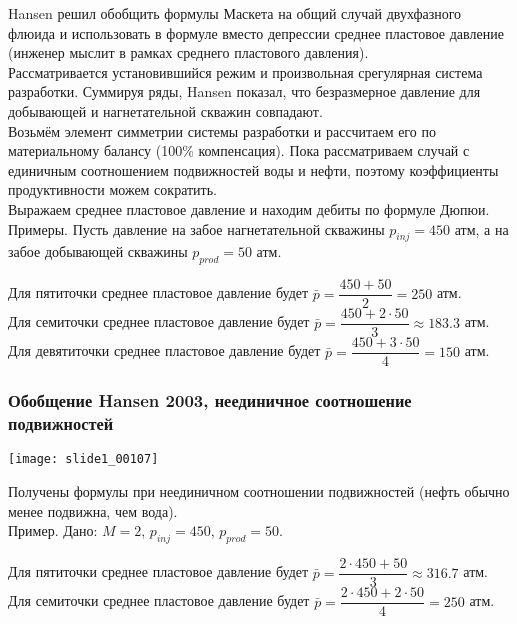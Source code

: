 \documentclass[main.tex]{subfiles}
\begin{document}
Hansen решил обобщить формулы Маскета на общий случай двухфазного флюида и использовать в формуле вместо депрессии среднее пластовое давление (инженер мыслит в рамках среднего пластового давления).\\

Рассматривается установившийся режим и произвольная срегулярная система разработки. Суммируя ряды, Hansen показал, что безразмерное давление для добывающей и нагнетательной скважин совпадают.\\

Возьмём элемент симметрии системы разработки и рассчитаем его по материальному балансу (100\% компенсация). Пока рассматриваем случай с единичным соотношением подвижностей воды и нефти, поэтому коэффициенты продуктивности можем сократить.\\

Выражаем среднее пластовое давление и находим дебиты по формуле Дюпюи.\\

Примеры.
Пусть давление на забое нагнетательной скважины $p_{inj}=450$ атм, а на забое добывающей скважины $p_{prod}=50$ атм.

Для пятиточки среднее пластовое давление будет $\bar{p}=\dfrac{450+50}{2}=250$ атм.\\

Для семиточки среднее пластовое давление будет $\bar{p}=\dfrac{450+2\cdot50}{3}\approx183.3$ атм.\\

Для девятиточки среднее пластовое давление будет $\bar{p}=\dfrac{450+3\cdot50}{4}=150$ атм.

\subsubsection{Обобщение Hansen 2003, неединичное соотношение подвижностей}

\texttt{[image: slide1\_00107]}

Получены формулы при неединичном соотношении подвижностей (нефть обычно менее подвижна, чем вода).\\

Пример.
Дано: $M=2$, $p_{inj}=450$, $p_{prod}=50$.

Для пятиточки среднее пластовое давление будет $\bar{p}=\dfrac{2\cdot450+50}{3}\approx316.7$ атм.\\

Для семиточки среднее пластовое давление будет $\bar{p}=\dfrac{2\cdot450+2\cdot50}{4}=250$ атм.\\
\end{document}
